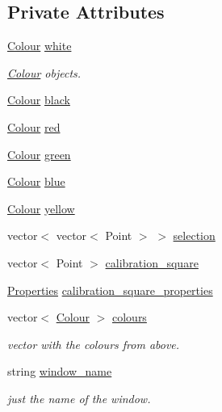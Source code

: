 \subsection*{Private Attributes}
\begin{DoxyCompactItemize}
\item 
\hyperlink{struct_colour}{Colour} \hyperlink{class_vision_a3c6321608149b7d3967fa83d7548d6eb}{white}
\begin{DoxyCompactList}\small\item\em \hyperlink{struct_colour}{Colour} objects. \end{DoxyCompactList}\item 
\hyperlink{struct_colour}{Colour} \hyperlink{class_vision_adc52ed0340e54fb14c8a3f397ec0bbc0}{black}
\item 
\hyperlink{struct_colour}{Colour} \hyperlink{class_vision_ad38a66e586f5d654be18ec7b292e73a7}{red}
\item 
\hyperlink{struct_colour}{Colour} \hyperlink{class_vision_aa05293fea4a19c7e1dce56d317ddd589}{green}
\item 
\hyperlink{struct_colour}{Colour} \hyperlink{class_vision_ae1f06c70a9065ce9daa2e6a8a8a828cb}{blue}
\item 
\hyperlink{struct_colour}{Colour} \hyperlink{class_vision_ad0e403eecfd6f309dbb94f2dd7c4696a}{yellow}
\item 
vector$<$ vector$<$ Point $>$ $>$ \hyperlink{class_vision_ad6bcc0c75d2ec3d3af8863f797d47493}{selection}
\item 
vector$<$ Point $>$ \hyperlink{class_vision_adfd3934ada55ba839129af775429bda0}{calibration\+\_\+square}
\item 
\hyperlink{struct_properties}{Properties} \hyperlink{class_vision_a2a950746f88058af9260fd7ec5cddb5a}{calibration\+\_\+square\+\_\+properties}
\item 
vector$<$ \hyperlink{struct_colour}{Colour} $>$ \hyperlink{class_vision_a6496f699a73a71319e02ed239c640478}{colours}
\begin{DoxyCompactList}\small\item\em vector with the colours from above. \end{DoxyCompactList}\item 
string \hyperlink{class_vision_aefa7b216c7f6dac43438e0f9df163dae}{window\+\_\+name}
\begin{DoxyCompactList}\small\item\em just the name of the window. \end{DoxyCompactList}\item 

\end{DoxyCompactItemize}
